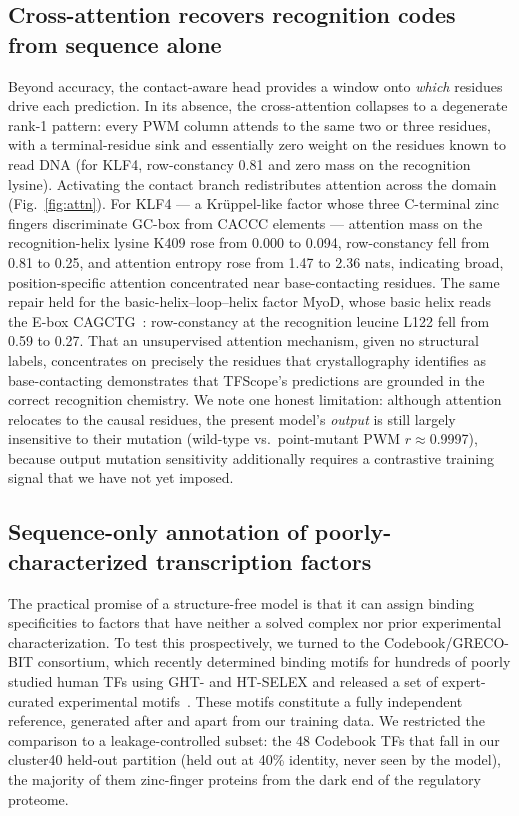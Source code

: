 \documentclass[11pt,letterpaper]{article}
\begin{document}
\subsection*{Cross-attention recovers recognition codes from sequence alone}

Beyond accuracy, the contact-aware head provides a window onto \textit{which}
residues drive each prediction. In its absence, the cross-attention collapses to a
degenerate rank-1 pattern: every PWM column attends to the same two or three
residues, with a terminal-residue sink and essentially zero weight on the residues
known to read DNA (for KLF4, row-constancy 0.81 and zero mass on the recognition
lysine). Activating the contact branch redistributes attention across the domain
(Fig.~\ref{fig:attn}). For KLF4 — a Krüppel-like factor whose three C-terminal
zinc fingers discriminate GC-box from CACCC elements — attention mass on the
recognition-helix lysine K409 rose from 0.000 to 0.094, row-constancy fell from 0.81
to 0.25, and attention entropy rose from 1.47 to 2.36 nats, indicating broad,
position-specific attention concentrated near base-contacting residues. The same
repair held for the basic-helix--loop--helix factor MyoD, whose basic helix reads
the E-box CAGCTG~\cite{Ma1994}: row-constancy at the recognition leucine L122 fell
from 0.59 to 0.27. That an unsupervised attention mechanism, given no structural
labels, concentrates on precisely the residues that crystallography identifies as
base-contacting demonstrates that TFScope's predictions are grounded in the correct
recognition chemistry. We note one honest limitation: although attention relocates
to the causal residues, the present model's \textit{output} is still largely
insensitive to their mutation (wild-type vs.\ point-mutant PWM $r\approx$0.9997),
because output mutation sensitivity additionally requires a contrastive training
signal that we have not yet imposed.

\subsection*{Sequence-only annotation of poorly-characterized transcription factors}

The practical promise of a structure-free model is that it can assign binding
specificities to factors that have neither a solved complex nor prior experimental
characterization. To test this prospectively, we turned to the Codebook/GRECO-BIT
consortium, which recently determined binding motifs for hundreds of poorly studied
human TFs using GHT- and HT-SELEX and released a set of expert-curated experimental
motifs~\cite{Codebook2024}. These motifs constitute a fully independent reference,
generated after and apart from our training data. We restricted the comparison to a
leakage-controlled subset: the 48 Codebook TFs that fall in our cluster40 held-out
partition (held out at 40\% identity, never seen by the model), the majority of them
zinc-finger proteins from the dark end of the regulatory proteome.
\end{document}
